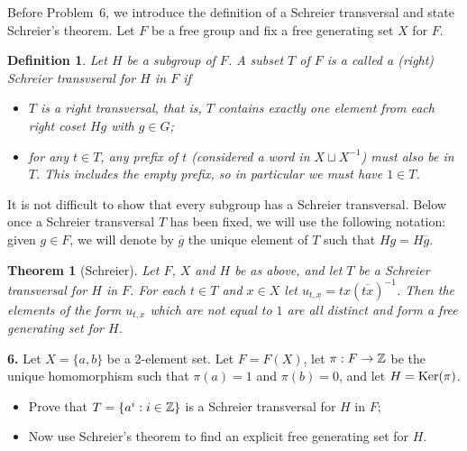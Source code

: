 \documentclass[12pt]{amsart}
\newtheorem* {Theorem}    {Theorem}
\newtheorem* {Definition}    {Definition}
\begin{document}
\skv
Before Problem~6, we introduce the definition of a Schreier transversal and state Schreier's theorem. Let $F$ be a free group and fix
a free generating set $X$ for $F$. 

\begin{Definition}\rm
Let $H$ be a subgroup of $F$. A subset $T$ of $F$ is a called a (right) {\it Schreier transvseral} for $H$ in $F$ if
\begin{itemize}
\item[(a)] $T$ is a right transversal, that is, $T$ contains exactly one element from each right coset $Hg$ with $g\in G$;
\item[(b)] for any $t\in T$, any prefix of $t$ (considered a word in $X\sqcup X^{-1}$) must also be in $T$. This includes
the empty prefix, so in particular we must have $1\in T$. 
\end{itemize}
\end{Definition}
It is not difficult to show that every subgroup has a Schreier transversal. Below once a Schreier transversal $T$ has been fixed,
we will use the following notation: given $g\in F$, we will denote by $\overline{g}$ the unique element of $T$ such that
$Hg=H\overline{g}$.

\begin{Theorem}[Schreier]
Let $F$, $X$ and $H$ be as above, and let $T$ be a Schreier transversal for $H$ in $F$. For each $t\in T$ and $x\in X$
let $u_{t,x}=tx(\overline{tx})^{-1}$. Then the elements of the form $u_{t,x}$ which are not equal to $1$ are all distinct and
form a free generating set for $H$.
\end{Theorem}
\skv

{\bf 6.} Let $X=\{a,b\}$ be a 2-element set. Let $F=F(X)$, let $\pi:F\to{\mathbb Z}$ be the unique homomorphism such that $\pi(a)=1$
and $\pi(b)=0$, and let $H={\rm Ker}(\pi)$. 
\begin{itemize}
\item[(a)] Prove that $T=\{a^i: i\in{\mathbb Z}\}$ is a Schreier transversal for $H$ in $F$;
\item[(b)] Now use Schreier's theorem to find an explicit free generating set for $H$.
\end{itemize}
\end{document}
